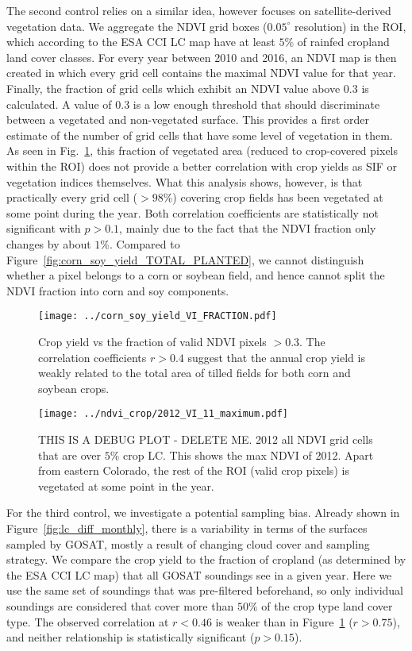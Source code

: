 \documentclass[preprint, a4paper, 10pt, times]{elsarticle}
\begin{document}
The second control relies on a similar idea, however focuses on satellite-derived vegetation data. We aggregate the NDVI grid boxes ($0.05^\circ$ resolution) in the ROI, which according to the ESA CCI LC map have at least $5\%$ of rainfed cropland land cover classes. For every year between 2010 and 2016, an NDVI map is then created in which every grid cell contains the maximal NDVI value for that year. Finally, the fraction of grid cells which exhibit an NDVI value above $0.3$ is calculated. A value of $0.3$ is a low enough threshold that should discriminate between a vegetated and non-vegetated surface. This provides a first order estimate of the number of grid cells that have some level of vegetation in them. As seen in Fig.~\ref{fig:corn_soy_yield_VI_FRACTION}, this fraction of vegetated area (reduced to crop-covered pixels within the ROI) does not provide a better correlation with crop yields as SIF or vegetation indices themselves. What this analysis shows, however, is that practically every grid cell ($>98\%$) covering crop fields has been vegetated at some point during the year. Both correlation coefficients are statistically not significant with $p > 0.1$, mainly due to the fact that the NDVI fraction only changes by about $1\%$. Compared to Figure~\ref{fig:corn_soy_yield_TOTAL_PLANTED}, we cannot distinguish whether a pixel belongs to a corn or soybean field, and hence cannot split the NDVI fraction into corn and soy components.

\begin{figure}[htbp]
\centering
\texttt{[image: ../corn\_soy\_yield\_VI\_FRACTION.pdf]}
\caption{Crop yield vs the fraction of valid NDVI pixels $> 0.3$. The correlation coefficients $r > 0.4$ suggest that the annual crop yield is weakly related to the total area of tilled fields for both corn and soybean crops.}
\label{fig:corn_soy_yield_VI_FRACTION}
\end{figure}

\begin{figure}[htbp]
\centering
\texttt{[image: ../ndvi\_crop/2012\_VI\_11\_maximum.pdf]}
\caption{THIS IS A DEBUG PLOT - DELETE ME. 2012 all NDVI grid cells that are over $5\%$ crop LC. This shows the max NDVI of 2012. Apart from eastern Colorado, the rest of the ROI (valid crop pixels) is vegetated at some point in the year.}
\label{fig:debug1}
\end{figure}

For the third control, we investigate a potential sampling bias. Already shown in Figure~\ref{fig:lc_diff_monthly}, there is a variability in terms of the surfaces sampled by GOSAT, mostly a result of changing cloud cover and sampling strategy. We compare the crop yield to the fraction of cropland (as determined by the ESA CCI LC map) that all GOSAT soundings see in a given year. Here we use the same set of soundings that was pre-filtered beforehand, so only individual soundings are considered that cover more than $50\%$ of the crop type land cover type. The observed correlation at $r < 0.46$ is weaker than in Figure~\ref{fig:corn_soy_yield_VI_FRACTION} ($r > 0.75$), and neither relationship is statistically significant ($p > 0.15$).
\end{document}
